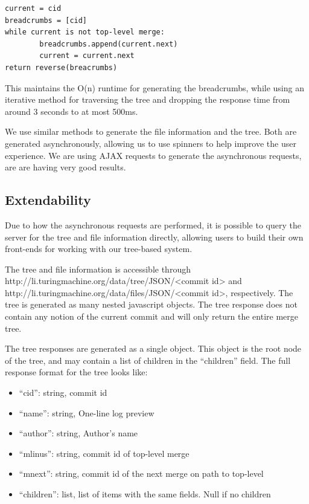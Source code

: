 \documentclass[conference, draftclsnofoot]{IEEEtran}
\begin{document}
\begin{verbatim}
current = cid
breadcrumbs = [cid]
while current is not top-level merge:
        breadcrumbs.append(current.next)
        current = current.next
return reverse(breacrumbs)
\end{verbatim}

This maintains the O(n) runtime for generating the breadcrumbs, while using an
iterative method for traversing the tree and dropping the response time from
around 3 seconds to at most 500ms.

We use similar methods to generate the file information and the tree. Both are
generated asynchronously, allowing us to use spinners to help improve the user
experience. We are using AJAX requests to generate the asynchronous requests,
are are having very good results.\newpage

\subsection{Extendability}
Due to how the asynchronous requests are performed, it is possible to query the
server for the tree and file information directly, allowing users to build
their own front-ends for working with our tree-based system.

The tree and file information is accessible through
http://li.turingmachine.org/data/tree/JSON/<commit id> and
http://li.turingmachine.org/data/files/JSON/<commit id>, respectively.
The tree is generated as many nested javascript objects. The tree response does
not contain any notion of the current commit and will only return the entire
merge tree.

The tree responses are generated as a single object. This object is the root
node of the tree, and may contain a list of children in the ``children'' field.
The full response format for the tree looks like:

\begin{itemize}
        \item ``cid'': string, commit id
        \item ``name'': string, One-line log preview
        \item ``author'': string, Author's name
        \item ``mlinus'': string, commit id of top-level merge
        \item ``mnext'': string, commit id of the next merge on path to
                top-level
        \item ``children'': list, list of items with the same fields. Null if
                no children
\end{itemize}
\end{document}
